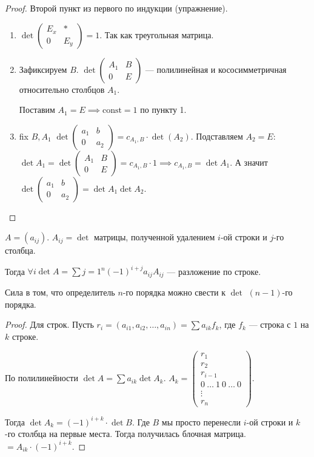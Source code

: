 \begin{proof}
    Второй пункт из первого по индукции (упражнение).

    \begin{enumerate}
        \item $\det \left( \begin{array}{c|c} E_x & \ast \\ \hline 0 & E_y \end{array}\right) = 1$. Так как треугольная матрица.
        \item Зафиксируем  $B$.  $\det \left( \begin{array}{c|c} A_1 & B \\ \hline 0 & E\end{array} \right)$ --- полилинейная и кососимметричная относительно столбцов  $A_1$.

            Поставим $A_1 = E \implies \text{const} = 1$ по пункту 1.
        \item fix $B, A_1$  $\det\left(\begin{array}{c|c} a_1 & b \\ \hline 0 & a_2 \end{array} \right) = c_{A_1, B} \cdot \det(A_2)$. Подставляем  $A_2 = E$:  $\det A_1 = \det\left(\begin{array}{c|c} A_1 & B \\ \hline 0 & E \end{array} \right) = c_{A_1, B} \cdot 1 \implies c_{A_1, B} = \det A_1$. А значит $\det\left(\begin{array}{c|c} a_1 & b \\ \hline 0 & a_2 \end{array} \right) = \det A_1 \det A_2$.
    \end{enumerate}
\end{proof}
\begin{theorem}
    $A = (a_{ij})$.  $A_{ij} = \det$ матрицы, полученной удалением  $i$-ой строки и  $j$-го столбца.

    Тогда  $\forall i \det A = \sum{j=1}^n (-1)^{i+j} a_{ij} A_{ij}$ --- разложение по строке.


    Сила в том, что определитель  $n$-го порядка можно свести к  $\det$  $(n-1)$-го порядка.
\end{theorem}
\begin{proof}
    Для строк. Пусть $r_i = (a_{i1}, a_{i 2}, \ldots, a_{in}) = \sum a_{ik}f_k$, где $f_k$ --- строка с  $1$ на  $k$ строке.

    По полилинейности  $\det A = \sum a_{ik} \det A_k$.  $A_k = \begin{pmatrix} r_1 \\ r_2 \\ r_{i-1} \\ 0\ \ldots\ 1\ 0\ \ldots\ 0 \\ \vdots \\ r_n \end{pmatrix}$.

        Тогда $\det A_k = (-1)^{i+k} \cdot \det B$. Где  $B$ мы просто перенесли  $i$-ой строки и  $k$-го столбца на первые места. Тогда получилась блочная матрица.  $= A_{ik} \cdot (-1)^{i+k}$.
\end{proof}

